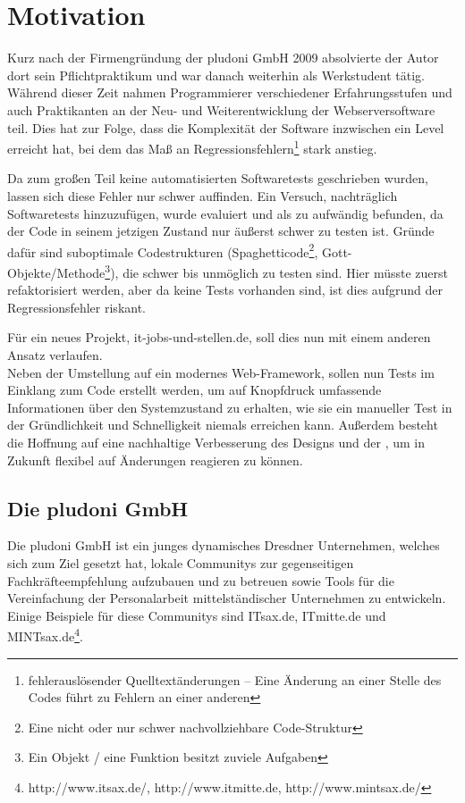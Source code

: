 \section{Motivation}

Kurz nach der Firmengründung der pludoni GmbH 2009 absolvierte der Autor dort sein Pflichtpraktikum und war danach weiterhin als Werkstudent tätig.
Während dieser Zeit nahmen Programmierer verschiedener Erfahrungsstufen und auch Praktikanten an der Neu- und Weiterentwicklung der Webserversoftware teil. Dies hat zur Folge, dass die Komplexität der Software inzwischen ein Level erreicht hat, bei dem das Maß an Regressionsfehlern\footnote{fehlerauslösender Quelltextänderungen -- Eine Änderung an einer Stelle des Codes führt zu Fehlern an einer anderen} stark anstieg.

Da zum großen Teil keine automatisierten Softwaretests geschrieben wurden, lassen sich diese Fehler nur schwer auffinden. Ein Versuch, nachträglich Softwaretests hinzuzufügen, wurde evaluiert und als zu aufwändig befunden, da der Code in seinem jetzigen Zustand nur äußerst schwer zu testen ist. Gründe dafür sind suboptimale Codestrukturen (Spaghetticode\footnote{Eine nicht oder nur schwer nachvollziehbare Code-Struktur}, Gott-Objekte/Methode\footnote{Ein Objekt / eine Funktion besitzt zuviele Aufgaben}), die schwer bis unmöglich zu testen sind. Hier müsste zuerst refaktorisiert werden, aber da keine Tests vorhanden sind, ist dies aufgrund der Regressionsfehler riskant. %

Für ein neues Projekt, it-jobs-und-stellen.de, soll dies nun mit einem anderen Ansatz verlaufen.\\
Neben der Umstellung auf ein modernes Web-Framework, sollen nun Tests im Einklang zum Code erstellt werden, um auf Knopfdruck umfassende Informationen über den Systemzustand zu erhalten, wie sie ein manueller Test in der Gründlichkeit und Schnelligkeit niemals erreichen kann. Außerdem besteht die Hoffnung auf eine nachhaltige Verbesserung des Designs und der , um in Zukunft flexibel auf Änderungen reagieren zu können.


\subsection{Die pludoni GmbH}

Die pludoni GmbH ist ein junges dynamisches Dresdner Unternehmen, welches sich zum Ziel gesetzt hat, lokale Communitys zur gegenseitigen Fachkräfteempfehlung aufzubauen und zu betreuen sowie Tools für die Vereinfachung der Personalarbeit mittelständischer Unternehmen zu entwickeln. Einige Beispiele für diese Communitys sind ITsax.de, ITmitte.de und MINTsax.de\footnote{http://www.itsax.de/, http://www.itmitte.de, http://www.mintsax.de/}.

